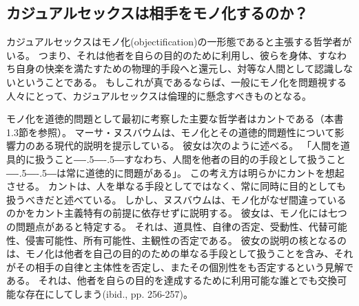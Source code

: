 \documentclass[paper=a4,book,openany]{jlreq}
\def\DDASH{―\kern-.5\zw―\kern-.5\zw―} %
\begin{document}
\subsection{カジュアルセックスは相手をモノ化するのか？}

カジュアルセックスはモノ化(objectification)の一形態であると主張する哲学者がいる。
つまり、それは他者を自らの目的のために利用し、彼らを身体、すなわち自身の快楽を満たすための物理的手段へと還元し、対等な人間として認識しないということである。
もしこれが真であるならば、一般にモノ化を問題視する人々にとって、カジュアルセックスは倫理的に懸念すべきものとなる。

モノ化を道徳的問題として最初に考察した主要な哲学者はカントである（本書1.3節を参照）。
マーサ・ヌスバウムは、モノ化とその道徳的問題性について影響力のある現代的説明を提示している。
彼女は次のように述べる。
「人間を道具的に扱うこと{\DDASH}すなわち、人間を他者の目的の手段として扱うこと{\DDASH}は常に道徳的に問題がある」\citep[p.289]{nussbaum95:_objec}。
この考え方は明らかにカントを想起させる。
カントは、人を単なる手段としてではなく、常に同時に目的としても扱うべきだと述べている。
しかし、ヌスバウムは、モノ化がなぜ間違っているのかをカント主義特有の前提に依存せずに説明する。
彼女は、モノ化には七つの問題点があると特定する。
それは、道具性、自律の否定、受動性、代替可能性、侵害可能性、所有可能性、主観性の否定である。
彼女の説明の核となるのは、モノ化は他者を自己の目的のための単なる手段として扱うことを含み、それがその相手の自律と主体性を否定し、またその個別性をも否定するという見解である。
それは、他者を自らの目的を達成するために利用可能な誰とでも交換可能な存在にしてしまう(ibid., pp. 256-257)。
\end{document}

